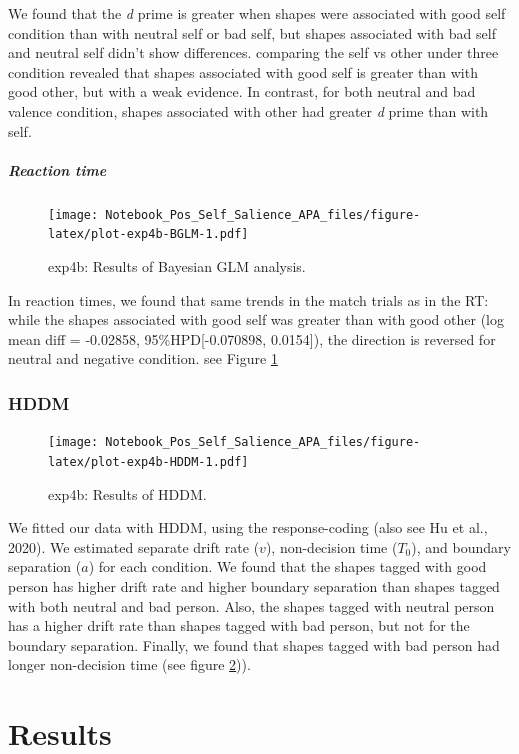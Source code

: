 \documentclass[
  english,
  man]{apa6}
\let\oldsubparagraph\subparagraph
\renewcommand{\subparagraph}[1]{\oldsubparagraph{#1}\mbox{}}
\begin{document}
We found that the \emph{d} prime is greater when shapes were associated with good self condition than with neutral self or bad self, but shapes associated with bad self and neutral self didn't show differences. comparing the self vs other under three condition revealed that shapes associated with good self is greater than with good other, but with a weak evidence. In contrast, for both neutral and bad valence condition, shapes associated with other had greater \emph{d} prime than with self.

\hypertarget{reaction-time-13}{%
\subparagraph{Reaction time}\label{reaction-time-13}}

\begin{figure}
\centering
\texttt{[image: Notebook\_Pos\_Self\_Salience\_APA\_files/figure-latex/plot-exp4b-BGLM-1.pdf]}
\caption{\label{fig:plot-exp4b-BGLM}exp4b: Results of Bayesian GLM analysis.}
\end{figure}

In reaction times, we found that same trends in the match trials as in the RT: while the shapes associated with good self was greater than with good other (log mean diff = -0.02858, 95\%HPD{[}-0.070898, 0.0154{]}), the direction is reversed for neutral and negative condition. see Figure \ref{fig:plot-exp4b-BGLM}

\hypertarget{hddm-8}{%
\subsubsection{HDDM}\label{hddm-8}}

\begin{figure}
\centering
\texttt{[image: Notebook\_Pos\_Self\_Salience\_APA\_files/figure-latex/plot-exp4b-HDDM-1.pdf]}
\caption{\label{fig:plot-exp4b-HDDM}exp4b: Results of HDDM.}
\end{figure}

We fitted our data with HDDM, using the response-coding (also see Hu et al., 2020). We estimated separate drift rate (\(v\)), non-decision time (\(T_{0}\)), and boundary separation (\(a\)) for each condition. We found that the shapes tagged with good person has higher drift rate and higher boundary separation than shapes tagged with both neutral and bad person. Also, the shapes tagged with neutral person has a higher drift rate than shapes tagged with bad person, but not for the boundary separation. Finally, we found that shapes tagged with bad person had longer non-decision time (see figure \ref{fig:plot-exp4b-HDDM})).

\hypertarget{results-9}{%
\section{Results}\label{results-9}}
\end{document}
